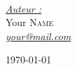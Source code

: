 \begin{titlepage}
\begin{center}
    \textsc{\Large }\\[0.7cm]

    \begin{center}
        \large
        \emph{\underline{Auteur :}}\\
        Your \textsc{Name}\\
        \href{mailto:your@mail.com}{\emph{your@mail.com}}\\
    \end{center}

    \vfill

    {\large \today}

    \end{center}
\end{titlepage}